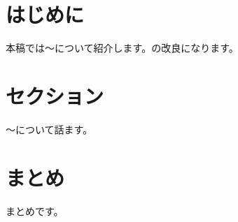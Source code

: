 \section{はじめに}
\label{sec:introduction}
本稿では〜について紹介します。\cite{GMR89}の改良になります。

\section{セクション}
〜について話ます。

\section{まとめ}
\label{sec:summary}
まとめです。
